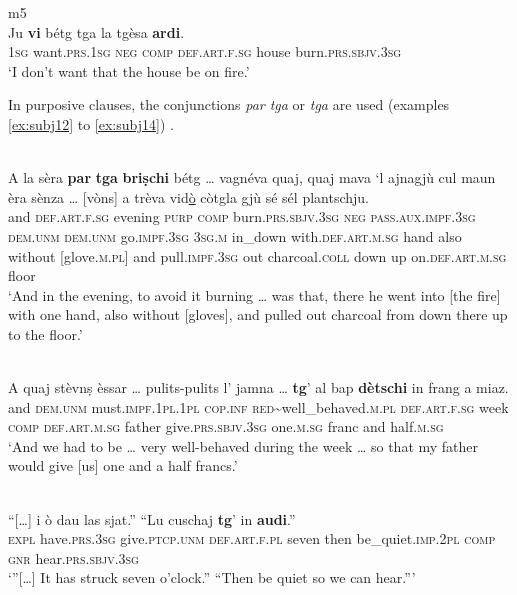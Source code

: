 \ea
\label{}
 {m5}\\
\gll Ju \textbf{vi} bétg tga la tgèsa \textbf{ardi}.\\
\textsc{1sg} want.\textsc{prs.1sg} \textsc{neg} \textsc{comp} \textsc{def.art.f.sg} house burn.\textsc{prs.sbjv.3sg}\\
\glt `I don't want that the house be on fire.'
\z

In purposive clauses, the conjunctions \textit{par tga} or \textit{tga} are used (examples \ref{ex:subj12} to \ref{ex:subj14}) .

\ea
\label{ex:subj12}
\\
\gll  A la sèra \textbf{par} \textbf{tga} \textbf{briṣchi} bétg … vagnéva quaj, quaj mava `l ajnagjù cul maun èra sènza … [vòns] a trèva vid\underline{ò} còtgla gjù sé sél plantschju.\\
and \textsc{def.art.f.sg} evening \textsc{purp} \textsc{comp} burn.\textsc{prs.sbjv.3sg} \textsc{neg} {} \textsc{pass.aux.impf.3sg} \textsc{dem.unm} \textsc{dem.unm} go.\textsc{impf.3sg} \textsc{3sg.m} in\_down with.\textsc{def.art.m.sg} hand also without {} [glove.\textsc{m.pl}] and pull.\textsc{impf.3sg} out charcoal.\textsc{coll} down up on.\textsc{def.art.m.sg} floor  \\
\glt `And in the evening, to avoid it burning … was that, there he went into [the fire] with one hand, also without [gloves], and pulled out charcoal from down there up to the floor.'
\z

\ea
\label{ex:subj13}
\\
	\gll    A quaj stèvnṣ èssar … pulits-pulits l’ jamna … {\longrule} \textbf{tg}’ al bap \textbf{dètschi} in frang a miaz.\\
	and \textsc{dem.unm} must.\textsc{impf.1pl.1pl} \textsc{cop.inf} {} \textsc{red}\textasciitilde{well\_behaved}.\textsc{m.pl} \textsc{def.art.f.sg} week {} {}  \textsc{comp} \textsc{def.art.m.sg} father  give.\textsc{prs.sbjv.3sg} one.\textsc{m.sg} franc and half.\textsc{m.sg}\\
\glt `And we had to be … very well-behaved during the week … so that my father would give [us] one and a half francs.'
\z

\ea
\label{ex:subj14}
\\
\gll  “[…] i ò dau las sjat.” “Lu cuschaj {\longrule} \textbf{tg}’ in \textbf{audi}.”\\
     {} \textsc{expl} have.\textsc{prs.3sg} give.\textsc{ptcp.unm} \textsc{def.art.f.pl} seven then be\_quiet.\textsc{imp.2pl} {}  \textsc{comp} \textsc{gnr} hear.\textsc{prs.sbjv.3sg}\\
\glt `”[…] It has struck seven o’clock.” “Then be quiet so we can hear.”'
\z


